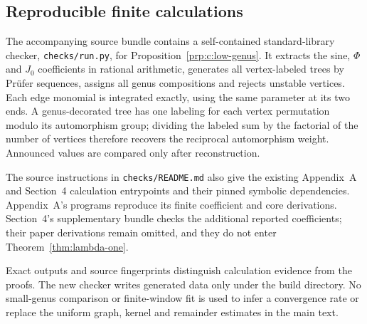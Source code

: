 \subsection{Reproducible finite calculations}
\label{subsec:c:02}

The accompanying source bundle contains a self-contained
standard-library checker, \texttt{checks/run.py}, for
Proposition~\ref{prp:c:low-genus}. It extracts the sine, $\Phi$
and $J_0$ coefficients in rational arithmetic, generates all
vertex-labeled trees by Pr\"ufer sequences, assigns all genus
compositions and rejects unstable vertices. Each edge monomial
is integrated exactly, using the same parameter at its two ends.
A genus-decorated tree has one labeling for each vertex
permutation modulo its automorphism group; dividing the labeled
sum by the factorial of the number of vertices therefore recovers the
reciprocal automorphism weight. Announced values are compared
only after reconstruction.

The source instructions in \texttt{checks/README.md} also give
the existing Appendix~A and Section~4 calculation entrypoints
and their pinned symbolic dependencies. Appendix~A's programs
reproduce its finite coefficient and core derivations. Section~4's
supplementary bundle checks the additional reported coefficients;
their paper derivations remain omitted, and they do not enter
Theorem~\ref{thm:lambda-one}.

Exact outputs and source fingerprints distinguish calculation
evidence from the proofs. The new checker writes generated data
only under the build directory. No small-genus comparison or
finite-window fit is used to infer a convergence rate or replace
the uniform graph, kernel and remainder estimates in the main text.
